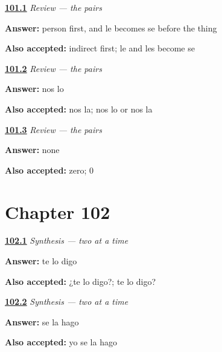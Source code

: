 \noindent\begin{minipage}[t]{\linewidth}
\raggedright
\hyperlink{review-ES-C47-repaso-dobles-two}{\textbf{101.1}} \emph{Review — the pairs}\par
\small \textbf{Answer:} person first, and le becomes se before the thing\par
\footnotesize \textbf{Also accepted:} indirect first; le and les become se
\end{minipage}\par\medskip

\noindent\begin{minipage}[t]{\linewidth}
\raggedright
\hyperlink{review-ES-C47-repaso-dobles-us}{\textbf{101.2}} \emph{Review — the pairs}\par
\small \textbf{Answer:} nos lo\par
\footnotesize \textbf{Also accepted:} nos la; nos lo or nos la
\end{minipage}\par\medskip

\noindent\begin{minipage}[t]{\linewidth}
\raggedright
\hyperlink{review-ES-C47-repaso-dobles-new}{\textbf{101.3}} \emph{Review — the pairs}\par
\small \textbf{Answer:} none\par
\footnotesize \textbf{Also accepted:} zero; 0
\end{minipage}\par\medskip

\section*{Chapter 102}

\noindent\begin{minipage}[t]{\linewidth}
\raggedright
\hyperlink{review-ES-C47-sintesis-dos-a-la-vez-you}{\textbf{102.1}} \emph{Synthesis — two at a time}\par
\small \textbf{Answer:} te lo digo\par
\footnotesize \textbf{Also accepted:} ¿te lo digo?; te lo digo?
\end{minipage}\par\medskip

\noindent\begin{minipage}[t]{\linewidth}
\raggedright
\hyperlink{review-ES-C47-sintesis-dos-a-la-vez-her}{\textbf{102.2}} \emph{Synthesis — two at a time}\par
\small \textbf{Answer:} se la hago\par
\footnotesize \textbf{Also accepted:} yo se la hago
\end{minipage}\par\medskip

